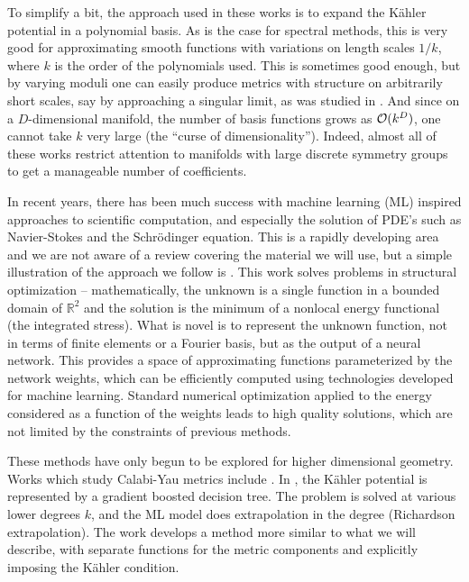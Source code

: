 \documentclass[12pt]{article}
\def\IR{\mathbb{R}}
\def\CO {{\cal O}}
\begin{document}
To simplify a bit, the approach used in these works is to expand the K\"ahler potential in a polynomial basis.
As is the case for spectral methods, this is very good for approximating smooth functions with variations on
length scales $1/k$, where $k$ is the order of the polynomials used.  This is sometimes good enough, but by varying
moduli one can easily produce metrics with structure on arbitrarily short scales, say by approaching a singular
limit, as was studied in \cite{Cui:2019uhy}.  And since on a $D$-dimensional manifold, the number of basis functions grows as $\CO(k^D)$, one cannot take $k$ very large (the ``curse of dimensionality'').  Indeed, almost all of these works restrict
attention to manifolds with large discrete symmetry groups to get a manageable number of coefficients.

In recent years, there has been much success with machine learning (ML) inspired approaches to scientific
computation, and especially the solution of PDE's such as Navier-Stokes and the Schr\"odinger equation.
This is a rapidly developing area and we are not aware of a review covering the material we will use,
but a simple illustration of the approach
we follow is \cite{Hoyer2019}.  This work solves problems in structural optimization -- mathematically, the
unknown is a single function in a bounded domain of $\IR^2$ and the solution is the minimum of a nonlocal
energy functional (the integrated stress).  What is novel is to represent the unknown function,
not in terms of finite elements or a Fourier basis, but as the output of a neural network.  This provides
a space of approximating functions parameterized by the network weights, which can be efficiently computed
using technologies developed for machine learning.  Standard numerical optimization applied
to the energy considered as a function of the weights leads to high quality solutions, which are not limited
by the constraints of previous methods.

These methods have only begun to be explored for higher dimensional geometry.
Works which study Calabi-Yau metrics include \cite{Ashmore:2019wzb,Anderson:2020}.
In \cite{Ashmore:2019wzb}, the K\"ahler potential is represented by a gradient boosted decision tree.
The problem is solved at various lower degrees $k$, and the ML model does extrapolation in the degree
(Richardson extrapolation).    The work \cite{Anderson:2020} develops a method more similar to what we will
describe, with separate functions for the metric components and explicitly imposing the K\"ahler condition. 
\end{document}
